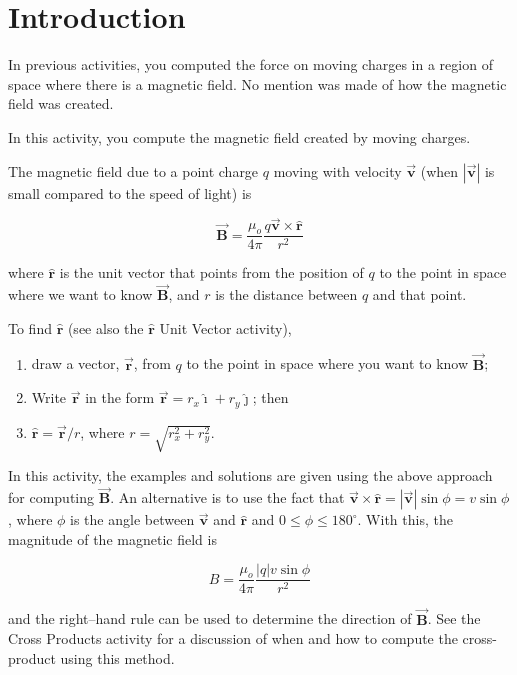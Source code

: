 \documentclass{article}
\newcommand{\ihat}[0]{\hat{\boldsymbol{\imath}}}
\newcommand{\jhat}[0]{\hat{\boldsymbol{\jmath}}}
\newcommand{\rhat}[0]{\hat{\mathbf{r}}}
\newcommand{\bfvec}[1]{\vec{\mathbf{#1}}}
\begin{document}
\section{Introduction}

In previous activities, you computed the force on moving charges in a region of space where there is a magnetic field. No mention was made of how the magnetic field was created.

In this activity, you compute the magnetic field created by moving charges.

The magnetic field due to a point charge $q$ moving with velocity $\bfvec{v}$ (when $|\bfvec{v}|$ is small compared to the speed of light) is

$$
\bfvec{B} = \frac{\mu_o}{4\pi}\frac{q\bfvec{v}\times\hat{\mathbf{r}}}{r^2}
$$

where $\rhat$ is the unit vector that points from the position of $q$ to the point in space where we want to know $\bfvec{B}$, and $r$ is the distance between $q$ and that point.

To find $\rhat$ (see also the $\rhat$ Unit Vector activity), 

\begin{enumerate}

  \item draw a vector, $\bfvec{r}$, from $q$ to the point in space where you want to know $\bfvec{B}$;

  \item Write $\bfvec{r}$ in the form $\bfvec{r}=r_x\ihat+r_y\jhat$; then

  \item $\rhat=\bfvec{r}/r$, where $r=\sqrt{r_x^2+r_y^2}$.

\end{enumerate}

In this activity, the examples and solutions are given using the above approach for computing $\bfvec{B}$. An alternative is to use the fact that $\bfvec{v}\times\hat{\mathbf{r}}=|\bfvec{v}|\sin\phi=v\sin\phi$, where $\phi$ is the angle between $\bfvec{v}$ and $\hat{\mathbf{r}}$ and $0 \le\phi \le 180^{\circ}$. With this, the magnitude of the magnetic field is

$$
B = \frac{\mu_o}{4\pi}\frac{|q|v\sin\phi}{r^2}
$$

and the right--hand rule can be used to determine the direction of $\bfvec{B}$. See the Cross Products activity for a discussion of when and how to compute the cross-product using this method.

\ifsolutions
\end{document}
